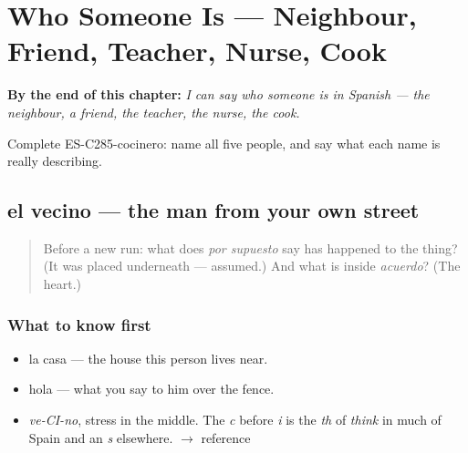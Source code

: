 
\chapter{Who Someone Is --- Neighbour, Friend, Teacher, Nurse, Cook}
\label{ch:quien-es}

\begin{chapteropening}
\textbf{By the end of this chapter:} \emph{I can say who someone is in Spanish — the neighbour, a friend, the teacher, the nurse, the cook.}

Complete ES-C285-cocinero: name all five people, and say what each name is really describing.
\end{chapteropening}

\section[el vecino]{el vecino — the man from your own street}

\label{lesson:ES-C285-vecino}



\begin{quote}
Before a new run: what does \emph{por supuesto} say has happened to the thing? (It was placed underneath — assumed.) And what is inside \emph{acuerdo}? (The heart.)
\end{quote}

\subsection*{What to know first}
\begin{itemize}
\raggedright
  \item la casa — the house this person lives near.
  \item hola — what you say to him over the fence.
\end{itemize}

\begin{sounds}
\begin{itemize}
\raggedright
  \item \emph{ve-CI-no}, stress in the middle. The \emph{c} before \emph{i} is the \emph{th} of \emph{think} in much of Spain and an \emph{s} elsewhere. $\to$ reference
\end{itemize}
\end{sounds}

